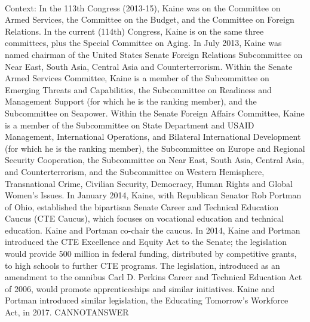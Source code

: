 \documentclass[11pt,a4paper, onecolumn]{article}
\begin{document}
\\ Context: In the 113th Congress (2013-15), Kaine was on the Committee on Armed Services, the Committee on the Budget, and the Committee on Foreign Relations. In the current (114th) Congress, Kaine is on the same three committees, plus the Special Committee on Aging. In July 2013, Kaine was named chairman of the United States Senate Foreign Relations Subcommittee on Near East, South Asia, Central Asia and Counterterrorism. Within the Senate Armed Services Committee, Kaine is a member of the Subcommittee on Emerging Threats and Capabilities, the Subcommittee on Readiness and Management Support (for which he is the ranking member), and the Subcommittee on Seapower. Within the Senate Foreign Affairs Committee, Kaine is a member of the Subcommittee on State Department and USAID Management, International Operations, and Bilateral International Development (for which he is the ranking member), the Subcommittee on Europe and Regional Security Cooperation, the Subcommittee on Near East, South Asia, Central Asia, and Counterterrorism, and the Subcommittee on Western Hemisphere, Transnational Crime, Civilian Security, Democracy, Human Rights and Global Women's Issues. In January 2014, Kaine, with Republican Senator Rob Portman of Ohio, established the bipartisan Senate Career and Technical Education Caucus (CTE Caucus), which focuses on vocational education and technical education. Kaine and Portman co-chair the caucus. In 2014, Kaine and Portman introduced the CTE Excellence and Equity Act to the Senate; the legislation would provide  500 million in federal funding, distributed by competitive grants, to high schools to further CTE programs. The legislation, introduced as an amendment to the omnibus Carl D. Perkins Career and Technical Education Act of 2006, would promote apprenticeships and similar initiatives. Kaine and Portman introduced similar legislation, the Educating Tomorrow's Workforce Act, in 2017. CANNOTANSWER
\end{document}
